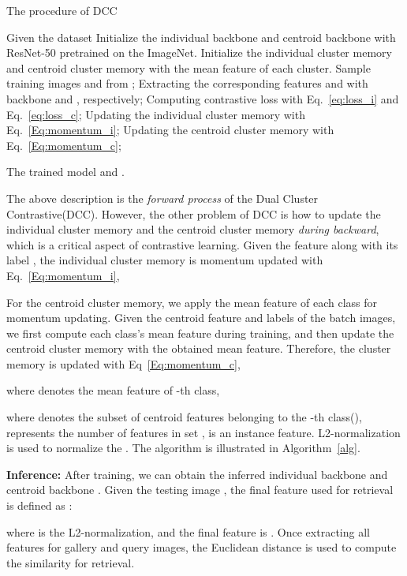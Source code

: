 \documentclass[10pt,twocolumn,letterpaper]{article}
\begin{document}
\begin{algorithm}[t]
\small
\caption{The procedure of DCC}
\label{alg}
 \begin{algorithmic}[1]
	\Require Given the dataset 
	\Require Initialize the individual backbone  and centroid backbone  with ResNet-50 pretrained on the ImageNet.
	\Require Initialize the individual cluster memory  and centroid cluster memory  with the mean feature of each cluster.
	\While { } 
		\State Sample training images  and  from ;
		\State Extracting the corresponding features  and  with backbone  and , respectively;
		\State Computing contrastive loss with Eq.~\eqref{eq:loss_i} and Eq.~\eqref{eq:loss_c};
		\State Updating the individual cluster memory  with Eq.~\eqref{Eq:momentum_i};
		\State Updating the centroid cluster memory  with Eq.~\eqref{Eq:momentum_c}; 
	\EndWhile

\Ensure The trained model  and . 
 \end{algorithmic}
\label{alg}
\end{algorithm}

The above description is the \emph{forward process} of the Dual Cluster Contrastive(DCC). 
However, the other problem of DCC is how to update the individual cluster memory  and the centroid cluster memory  \emph{during backward}, which is a critical aspect of contrastive learning.
Given the feature  along with its label ,  the individual cluster memory  is momentum updated with Eq.~\eqref{Eq:momentum_i},


For the centroid cluster memory, we apply the mean feature of each class for momentum updating.
Given the centroid feature  and labels  of the batch images, we first compute each class's mean feature during training, and then update the centroid cluster memory with the obtained mean feature.
Therefore, the cluster memory  is updated with Eq~\eqref{Eq:momentum_c},

where  denotes the mean feature of -th class,

where   denotes the subset of centroid features   belonging to the -th class(),  represents the number of features in set ,  is an instance feature.
L2-normalization is used to normalize the .
The algorithm is illustrated in Algorithm~\ref{alg}.

\textbf{Inference:} After training, we can obtain the inferred individual backbone  and centroid backbone .
Given the testing image , the final feature used for retrieval is defined as :

where  is the L2-normalization, and the final feature is .
Once extracting all features for gallery and query images, the Euclidean distance is used to compute the similarity for retrieval. 
\end{document}
